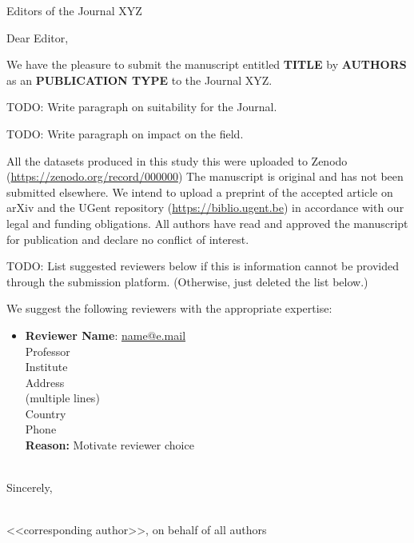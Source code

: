 \documentclass[11pt]{letter}
\begin{document}
\begin{letter}{Editors of the Journal XYZ}

\opening{Dear Editor,}

We have the pleasure to submit the manuscript entitled
\textbf{TITLE}
by \textbf{AUTHORS} as an \textbf{PUBLICATION TYPE} to the Journal XYZ.

TODO: Write paragraph on suitability for the Journal.

TODO: Write paragraph on impact on the field.

All the datasets produced in this study this were uploaded to Zenodo (\url{https://zenodo.org/record/000000}) The manuscript is original and has not been submitted elsewhere.
We intend to upload a preprint of the accepted article on arXiv and the UGent repository (\url{https://biblio.ugent.be}) in accordance with our legal and funding obligations.
All authors have read and approved the manuscript for publication and declare no conflict of interest.

TODO: List suggested reviewers below if this is information cannot be provided through the submission platform. (Otherwise, just deleted the list below.)

We suggest the following reviewers with the appropriate expertise:
%
\begin{itemize}[itemsep=12pt]
    \item
    \begin{minipage}[t]{\linewidth}
    \textbf{Reviewer Name}: \href{mailto:name@e.mail}{name@e.mail} \\
    Professor \\
    Institute \\
    Address \\
    (multiple lines) \\
    Country \\
    Phone \\
    \textbf{Reason:} Motivate reviewer choice
    \end{minipage}
\end{itemize}

\-\\[1em]
Sincerely,

\-\\[4\medskipamount]

<<corresponding author>>, on behalf of all authors


\end{letter}
\end{document}
